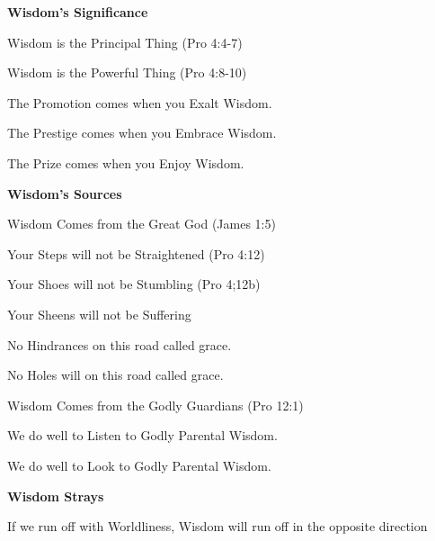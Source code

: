\begin{compactenum}[I.][4]
    \item \textbf{Wisdom's Significance}
    \begin{compactenum}[A.]
        \item Wisdom is the Principal Thing (Pro 4:4-7)
        \item Wisdom is the Powerful Thing (Pro 4:8-10)
        \begin{compactenum}[1.]
            \item The Promotion comes when you Exalt Wisdom.
            \item The Prestige comes when you Embrace Wisdom.
            \item The Prize comes when you Enjoy Wisdom.
        \end{compactenum}
    \end{compactenum}
    \item \textbf{Wisdom's Sources}
    \begin{compactenum}[A.]
        \item Wisdom Comes from the Great God (James 1:5)
        \begin{compactenum}[1.]
            \item Your Steps will not be Straightened (Pro 4:12)
            \item Your Shoes will not be Stumbling (Pro 4;12b)
            \item Your Sheens will not be Suffering
            \begin{compactenum}[1.]
                \item No Hindrances on this road called grace.
                \item No Holes will on this road called grace.
            \end{compactenum}
        \end{compactenum}
        \item Wisdom Comes from the Godly Guardians (Pro 12:1)
        \begin{compactenum}[1.]
            \item We do well to Listen to Godly Parental Wisdom.
            \item We do well to Look to Godly Parental Wisdom.
        \end{compactenum}
    \end{compactenum}
    \item \textbf{Wisdom Strays}
    \begin{compactenum}[A.]
        \item If we run off with Worldliness, Wisdom will run off in the opposite direction\!

\end{compactenum}
\end{compactenum}
